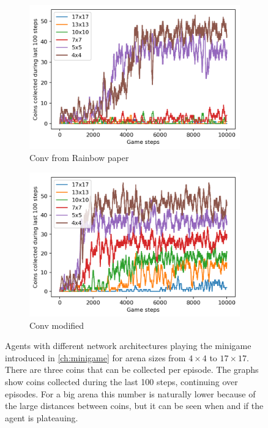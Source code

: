 \begin{figure}
\begin{subfigure}[b]{0.48\linewidth}
    	\includegraphics[width=\linewidth]{images/minigame-conv8-4-3-arch.png}
    \caption{Conv from Rainbow paper\cite{Hessel2018RainbowCI}}
    \label{fig:network-conv843}
  \end{subfigure}
  \quad
  \begin{subfigure}[b]{0.48\linewidth}
    \centering
      \includegraphics[width=\linewidth]{images/minigame-conv1-4-3-arch.png}
    \caption{Conv modified}
    \label{fig:network-conv143}
  \end{subfigure}
  \caption{Agents with different network architectures playing the minigame introduced in \ref{ch:minigame} for arena sizes from $4\times4$ to $17\times17$. There are three coins that can be collected per episode. The graphs show coins collected during the last 100 steps, continuing over episodes. For a big arena this number is naturally lower because of the large distances between coins, but it can be seen when and if the agent is plateauing.}
  \label{fig:networks}
\end{figure}


